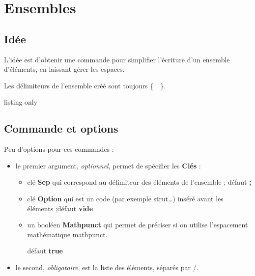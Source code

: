 \documentclass[a4paper,french,11pt]{article}
\newcommand\Cle[1]{{\bfseries\sffamily\textlangle #1\textrangle}}
\begin{document}
\pagebreak

\section{Ensembles}\label{ensembles}

\subsection{Idée}

\begin{tipblock}
L'idée est d'obtenir une commande pour simplifier l'écriture d'un ensemble d'éléments, en laissant gérer les espaces.

Les délimiteurs de l'ensemble créé sont toujours \textsf{\{~~\}}.
\end{tipblock}

\begin{PresCodeTexPL}{listing only}
\end{PresCodeTexPL}

\subsection{Commande et options}

\begin{cautionblock}
Peu d'options pour ces commandes :

\begin{itemize}
\item le premier argument, \textit{optionnel}, permet de spécifier les \Cle{Clés} :
\begin{itemize}
	\item clé \Cle{Sep} qui correspond au délimiteur des éléments de l'ensemble ; \hfill{}défaut \Cle{;}
	\item clé \Cle{Option} qui est un code (par exemple \textsf{strut}\dots) inséré avant les éléments ;\hfill{}défaut \Cle{vide}
	\item un booléen \Cle{Mathpunct} qui permet de préciser si on utilise l'espacement mathématique \textsf{mathpunct}.
	
	\hfill{}défaut \Cle{true}
\end{itemize}
\item le second, \textit{obligatoire}, est la \textsf{liste} des éléments, séparés par \textsf{/}.
\end{itemize}
\vspace*{-\baselineskip}\leavevmode
\end{cautionblock}
\end{document}
